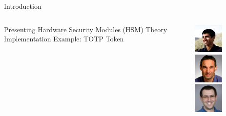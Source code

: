 \placelogofalse
\begin{frame}{Introduction}
\begin{columns}
\centering
\begin{outline}
  \1 Presenting \cite{Athalye2022Verifying}
  \1 Hardware Security Modules (HSM)
  \1 Theory
  \1 Implementation
  \1 Example: TOTP Token
\end{outline}

\begin{center}
\centering
{}

\includegraphics[width=1.5cm]{author_athalye.jpg} 
\includegraphics[width=1.5cm]{author_kaashoek.jpg} 
\includegraphics[width=1.5cm]{author_zeldovich.jpg} 

\end{center}
\end{columns}
\end{frame}
\placelogotrue


